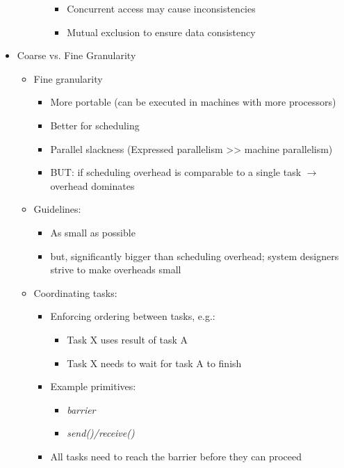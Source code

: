 \documentclass[a4paper]{article}
\begin{document}
\begin{itemize}
\begin{itemize}
\begin{itemize}
\begin{itemize}
\item Concurrent access may cause inconsistencies
\item Mutual exclusion to ensure data consistency
\end{itemize}
\end{itemize}
\end{itemize}
\item Coarse vs. Fine Granularity
\begin{itemize}
\item Fine granularity
\begin{itemize}
\item More portable (can be executed in machines with more processors)
\item Better for scheduling 
\item Parallel slackness (Expressed parallelism >> machine parallelism)
\item BUT: if scheduling overhead is comparable to a single task $\to$ overhead dominates
\end{itemize}
\item Guidelines:
\begin{itemize}
\item As small as possible
\item but, significantly bigger than scheduling overhead; system designers strive to make overheads small
\end{itemize}
\item Coordinating tasks:
\begin{itemize}
\item Enforcing ordering between tasks, e.g.:
\begin{itemize}
\item Task X uses result of task A
\item Task X needs to wait for task A to finish
\end{itemize}
\item Example primitives:
\begin{itemize}
\item \emph{barrier}
\item \emph{send()/receive()}
\end{itemize}
\item All tasks need to reach the barrier before they can proceed
\end{itemize}
\end{itemize}
\end{itemize}
\end{document}
